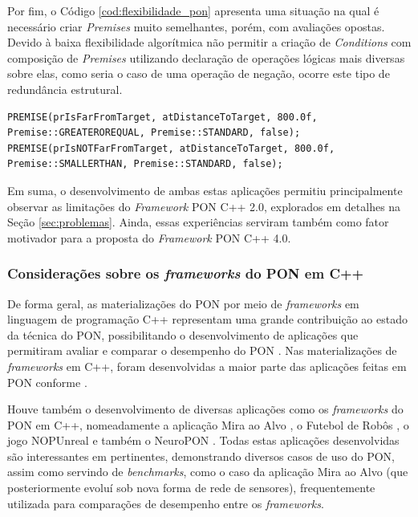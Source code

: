 Por fim, o Código \ref{cod:flexibilidade_pon} apresenta uma situação na qual é
necessário criar \textit{Premises} muito semelhantes, porém, com avaliações
opostas. Devido à baixa flexibilidade algorítmica não permitir a criação de
\textit{Conditions} com composição de \textit{Premises} utilizando declaração de
operações lógicas mais diversas sobre elas, como seria o caso de uma operação de
negação, ocorre este tipo de redundância estrutural.

\begin{lstlisting}[caption = {Uso de premissas redundantes no PON}, float=htb,
source = {Autoria própria},
label = {cod:flexibilidade_pon}]
PREMISE(prIsFarFromTarget, atDistanceToTarget, 800.0f, Premise::GREATEROREQUAL, Premise::STANDARD, false);
PREMISE(prIsNOTFarFromTarget, atDistanceToTarget, 800.0f, Premise::SMALLERTHAN, Premise::STANDARD, false);
\end{lstlisting}

Em suma, o desenvolvimento de ambas estas aplicações permitiu principalmente
observar as limitações do \textit{Framework} PON C++ 2.0, explorados em detalhes
na Seção \ref{sec:problemas}. Ainda, essas experiências serviram também como
fator motivador para a proposta do \textit{Framework} PON C++ 4.0.

\subsubsection{Considerações sobre os \textit{frameworks} do PON em C++}

De forma geral, as materializações do PON por meio de \textit{frameworks} em
linguagem de programação C++ representam uma grande contribuição ao estado da
técnica do PON, possibilitando o desenvolvimento de aplicações que permitiram
avaliar e comparar o desempenho do PON
\cite{msc_Banaszewski_2009,msc_Ronszcka_2012,msc_valenca_2012}. Nas
materializações de \textit{frameworks} em C++, foram desenvolvidas a maior parte
das aplicações feitas em PON conforme
\cite{msc_Ronszcka_2012,msc_santos_2017,doc_ronszcka_2019}.

Houve também o desenvolvimento de diversas aplicações como os
\textit{frameworks} do PON em C++, nomeadamente a aplicação Mira ao Alvo
\cite{msc_Banaszewski_2009,msc_Ronszcka_2012,msc_valenca_2012}, o Futebol de
Robôs \cite{msc_santos_2017,lima_2020}, o jogo NOPUnreal \cite{neves_2020} e
também o NeuroPON \cite{belmonte_2012,belmonte_2016,doc_Schutz_2019}. Todas
estas aplicações desenvolvidas são interessantes em pertinentes, demonstrando
diversos casos de uso do PON, assim como servindo de \textit{benchmarks}, como o
caso da aplicação Mira ao Alvo (que posteriormente evoluí sob nova forma de rede
de sensores), frequentemente utilizada para comparações de desempenho entre os
\textit{frameworks}. 

